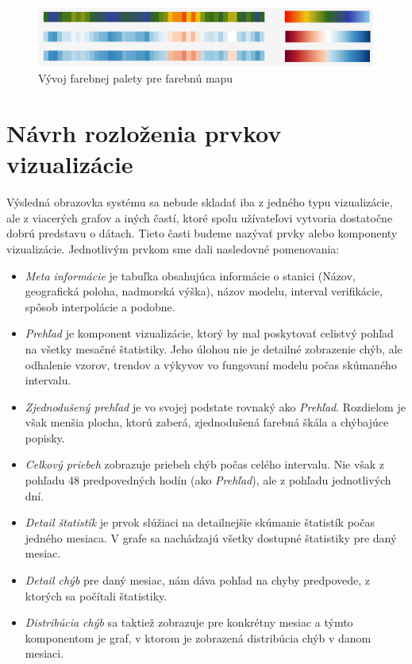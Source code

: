 \begin{figure}
	\centering
	\includegraphics[width = 5in]{colorpalettes}
	\caption{Vývoj farebnej palety pre farebnú mapu}
	\label{fig:colorpalettes}
\end{figure}


\section{Návrh rozloženia prvkov vizualizácie}
Výsledná obrazovka systému sa nebude skladať iba z jedného typu vizualizácie, ale z viacerých grafov a iných častí, ktoré spolu užívateľovi vytvoria dostatočne dobrú predstavu o dátach. Tieto časti budeme nazývať prvky alebo komponenty vizualizácie. Jednotlivým prvkom sme dali nasledovné pomenovania: 

\begin{itemize}
	\item\textit{Meta informácie} je tabuľka obsahujúca informácie o stanici (Názov, geografická poloha, nadmorská výška), názov modelu, interval verifikácie, spôsob interpolácie a podobne.  
		
	\item\textit{Prehľad} je komponent vizualizácie, ktorý by mal poskytovať celistvý pohľad na všetky mesačné štatistiky. Jeho úlohou nie je detailné zobrazenie chýb, ale odhalenie vzorov, trendov a výkyvov vo fungovaní modelu počas skúmaného intervalu.
	
	\item\textit{Zjednodušený prehľad} je vo svojej podstate rovnaký ako \textit{Prehľad}. Rozdielom je však menšia plocha, ktorú zaberá, zjednodušená farebná škála a chýbajúce popisky.
	
	\item\textit{Celkový priebeh} zobrazuje priebeh chýb počas celého intervalu. Nie však z pohľadu 48 predpovedných hodín (ako \textit{Prehľad}), ale z pohľadu jednotlivých dní.
	
	\item\textit{Detail štatistík} je prvok slúžiaci na detailnejšie skúmanie štatistík počas jedného mesiaca. V grafe sa nachádzajú všetky dostupné štatistiky pre daný mesiac.
	
	\item\textit{Detail chýb} pre daný mesiac, nám dáva pohľad na chyby predpovede, z ktorých sa počítali štatistiky.
	
	\item\textit{Distribúcia chýb} sa taktiež zobrazuje pre konkrétny mesiac a týmto komponentom je graf, v ktorom je zobrazená distribúcia chýb v danom mesiaci.
\end{itemize}

